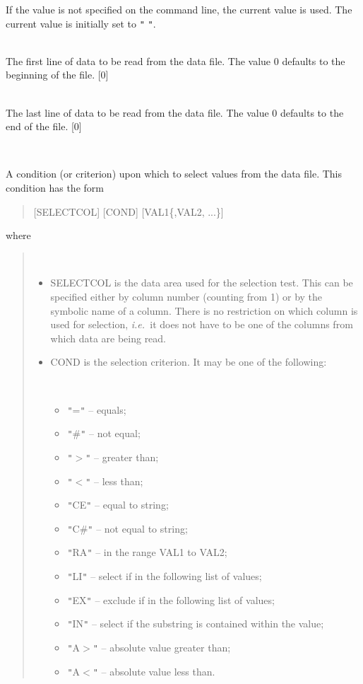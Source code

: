 \documentclass[twoside,11pt]{article}
\renewcommand{\_}{\texttt{\symbol{95}}}
\newcommand{\ie}{{\em i.e.\ }}
\newcommand{\sstsubsection}[1]{ \item[{#1}] \mbox{} \\}
\newcommand{\sstitemlist}[1]{
  \mbox{} \\
  \vspace{-3.5ex}
  \begin{itemize}
     #1
  \end{itemize}
}
\newcommand{\sstitem}{\item}
\newcommand{\sstsubsection}[1]{\item[{#1}]}
\newcommand{\sstitemlist}[1]{
      \begin{itemize}
         #1
      \end{itemize}
      \\
   }
\newcommand{\sstitem}{\item}
\begin{document}
\begin{sloppypar}
{{{         If the value is not specified on the command line, the current
         value is used. The current value is initially set to {\tt "} {\tt "}.
      }
      \sstsubsection{
         FROM = \_INTEGER (Read and Write)
      }{
         The first line of data to be read from the data file. The value
         0 defaults to the beginning of the file.
         [0]
      }
      \sstsubsection{
         TO = \_INTEGER (Read and Write)
      }{
         The last line of data to be read from the data file. The value
         0 defaults to the end of the file.
         [0]
      }
      \sstsubsection{
         SELCOND = \_CHAR (Read and Write)
      }{
         A condition (or criterion) upon which to select values from
         the data file.  This condition has the form

         \begin{quote}
            [SELECT\_COL] [COND] [VAL1\{,VAL2, ...\}]
         \end{quote}

         where

         \begin{quote}
         \sstitemlist{

            \sstitem
               SELECT\_COL is the data area used for the selection
               test. This can be specified either by column number
               (counting from 1) or by the symbolic name of a column.
               There is no restriction on which column is used for
               selection, \ie it does not have to be one of the columns
               from which data are being read.

            \sstitem
               COND is the selection criterion. It may be one of the
               following:

            \sstitemlist{

               \sstitem {\tt "}={\tt "} -- equals;
               \sstitem {\tt "}\#{\tt "} -- not equal;
               \sstitem {\tt "}$>${\tt "} -- greater than;
               \sstitem {\tt "}$<${\tt "} -- less than;
               \sstitem {\tt "}CE{\tt "} -- equal to string;
               \sstitem {\tt "}C\#{\tt "} -- not equal to string;
               \sstitem {\tt "}RA{\tt "} -- in the range VAL1 to VAL2;
               \sstitem {\tt "}LI{\tt "} -- select if in the following list of values;
               \sstitem {\tt "}EX{\tt "} -- exclude if in the following list of values;
               \sstitem {\tt "}IN{\tt "} -- select if the substring is contained within the
               value;
               \sstitem {\tt "}A$>${\tt "} -- absolute value greater than;
               \sstitem {\tt "}A$<${\tt "} -- absolute value less than.
            }

}
\end{quote}}}}
\end{sloppypar}
\end{document}
